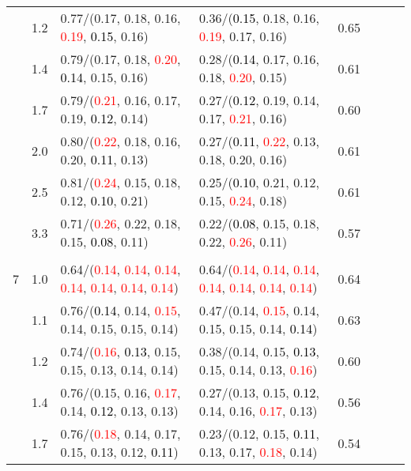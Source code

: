 \documentclass[10pt,a4paper]{report}
\begin{document}
\begin{table}[!htbp]
\begin{center}
{\begin{tabular}{ccllcccc}
			&1.2&0.77/(0.17, 0.18, 0.16, \textcolor{red}{0.19}, \textcolor{black}{0.15}, 0.16)&0.36/(\textcolor{black}{0.15}, 0.18, 0.16, \textcolor{red}{0.19}, 0.17, 0.16)&0.65\\
			&1.4&0.79/(0.17, 0.18, \textcolor{red}{0.20}, \textcolor{black}{0.14}, 0.15, 0.16)&0.28/(\textcolor{black}{0.14}, 0.17, 0.16, 0.18, \textcolor{red}{0.20}, 0.15)&0.61\\
			&1.7&0.79/(\textcolor{red}{0.21}, 0.16, 0.17, 0.19, \textcolor{black}{0.12}, 0.14)&0.27/(\textcolor{black}{0.12}, 0.19, 0.14, 0.17, \textcolor{red}{0.21}, 0.16)&0.60\\
			&2.0&0.80/(\textcolor{red}{0.22}, 0.18, 0.16, 0.20, \textcolor{black}{0.11}, 0.13)&0.27/(\textcolor{black}{0.11}, \textcolor{red}{0.22}, 0.13, 0.18, 0.20, 0.16)&0.61\\
			&2.5&0.81/(\textcolor{red}{0.24}, 0.15, 0.18, 0.12, \textcolor{black}{0.10}, 0.21)&0.25/(\textcolor{black}{0.10}, 0.21, 0.12, 0.15, \textcolor{red}{0.24}, 0.18)&0.61\\
			&3.3&0.71/(\textcolor{red}{0.26}, 0.22, 0.18, 0.15, \textcolor{black}{0.08}, 0.11)&0.22/(\textcolor{black}{0.08}, 0.15, 0.18, 0.22, \textcolor{red}{0.26}, 0.11)&0.57\\
			&&&&\\
			7			&1.0&0.64/(\textcolor{red}{0.14}, \textcolor{red}{0.14}, \textcolor{red}{0.14}, \textcolor{red}{0.14}, \textcolor{red}{0.14}, \textcolor{red}{0.14}, \textcolor{red}{0.14})&0.64/(\textcolor{red}{0.14}, \textcolor{red}{0.14}, \textcolor{red}{0.14}, \textcolor{red}{0.14}, \textcolor{red}{0.14}, \textcolor{red}{0.14}, \textcolor{red}{0.14})&0.64\\
			&1.1&0.76/(\textcolor{black}{0.14}, 0.14, \textcolor{red}{0.15}, 0.14, 0.15, 0.15, 0.14)&0.47/(0.14, \textcolor{red}{0.15}, 0.14, 0.15, 0.15, 0.14, \textcolor{black}{0.14})&0.63\\
			&1.2&0.74/(\textcolor{red}{0.16}, \textcolor{black}{0.13}, 0.15, 0.15, 0.13, 0.14, 0.14)&0.38/(0.14, 0.15, \textcolor{black}{0.13}, 0.15, 0.14, 0.13, \textcolor{red}{0.16})&0.60\\
			&1.4&0.76/(0.15, 0.16, \textcolor{red}{0.17}, 0.14, \textcolor{black}{0.12}, 0.13, 0.13)&0.27/(0.13, 0.15, \textcolor{black}{0.12}, 0.14, 0.16, \textcolor{red}{0.17}, 0.13)&0.56\\
			&1.7&0.76/(\textcolor{red}{0.18}, 0.14, 0.17, 0.15, 0.13, 0.12, \textcolor{black}{0.11})&0.23/(0.12, 0.15, \textcolor{black}{0.11}, 0.13, 0.17, \textcolor{red}{0.18}, 0.14)&0.54\\

\end{tabular}}
\end{center}
\end{table}
\end{document}
